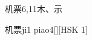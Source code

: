 \begin{entry}{机票}{6,11}{⽊、⽰}
  \begin{phonetics}{机票}{ji1 piao4}[][HSK 1]
  \end{phonetics}
\end{entry}
